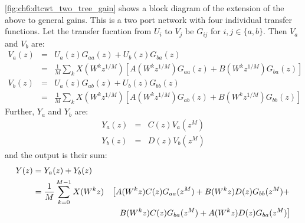 \autoref{fig:ch6:dtcwt_two_tree_gain} shows a block diagram of the extension of 
the above to general gains. This is a two port network with four individual
transfer functions. Let the transfer fucntion from $U_i$ to $V_j$
be $G_{ij}$ for $i, j \in \{a, b\}$. Then $V_a$ and $V_b$ are:
\begin{eqnarray}
  V_a(z) &=& U_a(z)G_{aa}(z) + U_b(z)G_{ba}(z) \\
         &=& \frac{1}{M} \sum_k X(W^{k} z^{1/M}) \left[A(W^k z^{1/M})G_{aa}(z) +
             B(W^k z^{1/M}) G_{ba}(z) \right] \\
  V_b(z) &=& U_a(z)G_{ab}(z) + U_b(z)G_{bb}(z) \\
         &=& \frac{1}{M} \sum_k X(W^{k} z^{1/M}) \left[A(W^k z^{1/M})G_{ab}(z) +
             B(W^k z^{1/M}) G_{bb}(z) \right] 
\end{eqnarray}
%
Further, $Y_a$ and $Y_b$ are:
\begin{eqnarray}
  Y_a(z) &=& C(z)V_a(z^M) \\
  Y_b(z) &=& D(z)V_b(z^M)
\end{eqnarray}
%
and the output is their sum:
\begin{alignat}{2}
    Y(z) &= Y_{a}(z) + Y_{b}(z) \\
         &= \frac{1}{M} \sum_{k=0}^{M-1} X(W^k z) & \left[  A(W^kz)C(z)G_{aa}(z^M) + B(W^kz)D(z)G_{bb}(z^M) + \right. \nonumber \\
         &                                        & \left. \hphantom{[}  B(W^kz)C(z)G_{ba}(z^M) + A(W^kz)D(z)G_{ba}(z^M) \right] 
    \label{eq:ch6:transfer}
\end{alignat}

